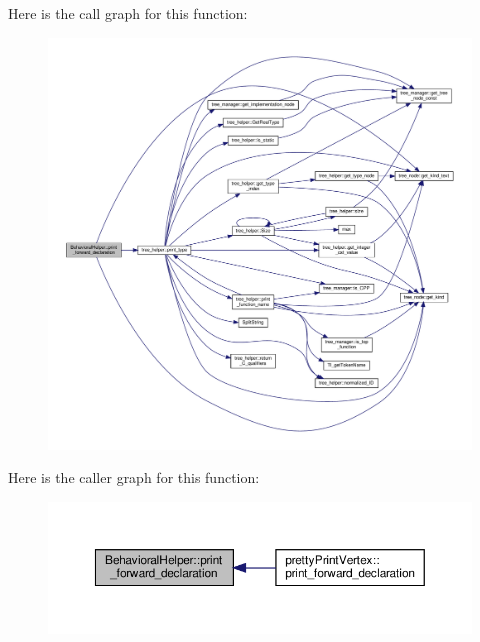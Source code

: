 Here is the call graph for this function\+:
\nopagebreak
\begin{figure}[H]
\begin{center}
\leavevmode
\includegraphics[width=350pt]{dd/db2/classBehavioralHelper_ab16307b9c784f8fe3940771bc937e611_cgraph}
\end{center}
\end{figure}
Here is the caller graph for this function\+:
\nopagebreak
\begin{figure}[H]
\begin{center}
\leavevmode
\includegraphics[width=350pt]{dd/db2/classBehavioralHelper_ab16307b9c784f8fe3940771bc937e611_icgraph}
\end{center}
\end{figure}
\mbox{\label{classBehavioralHelper_a23b0ff2925b78cc7a7714a51ac1c434b}} 
